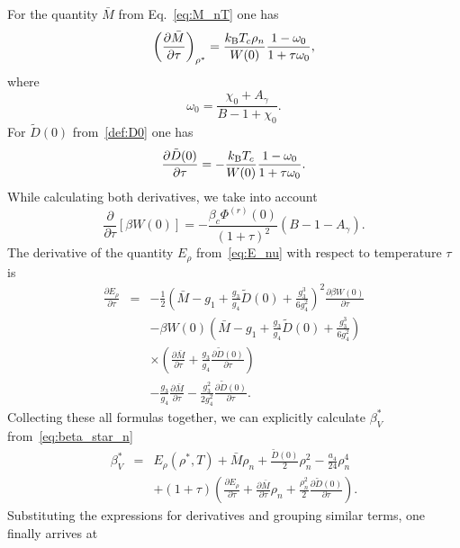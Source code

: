 For the quantity $\bar{M}$ from Eq.~\eqref{eq:M_nT} one has
\begin{equation}
	\left( \frac{\partial \bar{M}}{\partial \tau} \right)_{\rho^*} =
	\frac{k_{\rm B}T_c \rho_n}{W(0)} \frac{1 - \omega_0}{1 + \tau\omega_0},
\end{equation}
where
\begin{equation*}
	\omega_0 = \frac{\chi_0 + A_{\gamma}}{B - 1 + \chi_0}.
\end{equation*}
For $\tilde{D}(0)$ from~\eqref{def:D0} one has
\begin{equation}
	\frac{\partial \tilde{D}(0)}{\partial \tau} = -\frac{k_{\rm B}T_c}{W(0)} \frac{1 - \omega_0}{1 + \tau \omega_0}.
\end{equation}
While calculating both derivatives, we take into account
\begin{equation}
	\frac{\partial}{\partial \tau} \left[\beta W(0)\right] = -\frac{\beta_c \Phi^{(r)}(0)}{(1+\tau)^2} (B - 1 - A_{\gamma}).
\end{equation}
The derivative of the quantity $E_\rho$ from~\eqref{eq:E_nu} with respect to temperature $\tau$ is
\begin{eqnarray}
	\frac{\partial E_\rho}{\partial \tau} & = &  -\frac{1}{2}\left(\bar{M} - g_1 + \frac{g_3}{g_4} \tilde{D}(0) + \frac{g_3^3}{6g_4^2} \right)^{2} 
	\frac{\partial \beta W(0)}{\partial \tau} 
	\nonumber\\
	&&-\beta W(0)\left(\bar{M} - g_1 + \frac{g_3}{g_4} \tilde{D}(0) + \frac{g_3^3}{6g_4^2} \right)
	\nonumber\\
	&& \times \left(\frac{\partial \bar{M}}{\partial \tau} + \frac{g_3}{g_4}\frac{\partial\tilde{D}(0)}{\partial \tau}\right)
	\nonumber\\
	&& -\frac{g_3}{g_4}\frac{\partial \bar{M}}{\partial \tau} 
	- \frac{g_3^2}{2g_4^2}\frac{\partial \tilde{D}(0)}{\partial \tau}.
\end{eqnarray}
Collecting these all formulas together, we can explicitly calculate $\beta^*_V$ from~\eqref{eq:beta_star_n}
\begin{eqnarray}
	\beta^*_V & = & E_\rho (\rho^*,T) + \bar{M} \rho_{n} + \frac{\tilde D(0)}{2} \rho_{n}^2 - \frac{a_4}{24} \rho_{n}^4
	\nonumber\\
	&& + (1+\tau) \left(\frac{\partial E_{\rho}}{\partial \tau} + \frac{\partial \bar{M}}{\partial \tau}\rho_{n} + \frac{\rho_n^2}{2}\frac{\partial \tilde{D}(0)}{\partial \tau}\right).
\end{eqnarray}
Substituting the expressions for derivatives and grouping similar terms, one finally arrives at
